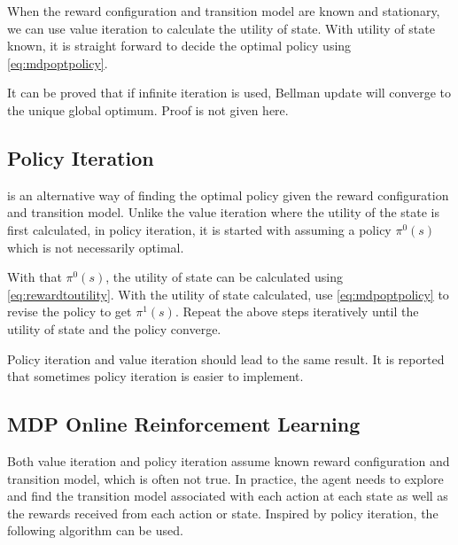 When the reward configuration and transition model are known and stationary, we can use value iteration to calculate the utility of state. With utility of state known, it is straight forward to decide the optimal policy using \eqref{eq:mdpoptpolicy}.

It can be proved that if infinite iteration is used, Bellman update will converge to the unique global optimum. Proof is not given here.

\subsection{Policy Iteration}

 is an alternative way of finding the optimal policy given the reward configuration and transition model. Unlike the value iteration where the utility of the state is first calculated, in policy iteration, it is started with assuming a policy $\pi^0(s)$ which is not necessarily optimal.

With that $\pi^0(s)$, the utility of state can be calculated using \eqref{eq:rewardtoutility}. With the utility of state calculated, use \eqref{eq:mdpoptpolicy} to revise the policy to get $\pi^1(s)$. Repeat the above steps iteratively until the utility of state and the policy converge.

Policy iteration and value iteration should lead to the same result. It is reported that sometimes policy iteration is easier to implement.

\subsection{MDP Online Reinforcement Learning}

Both value iteration and policy iteration assume known reward configuration and transition model, which is often not true. In practice, the agent needs to explore and find the transition model associated with each action at each state as well as the rewards received from each action or state. Inspired by policy iteration, the following  algorithm can be used.

